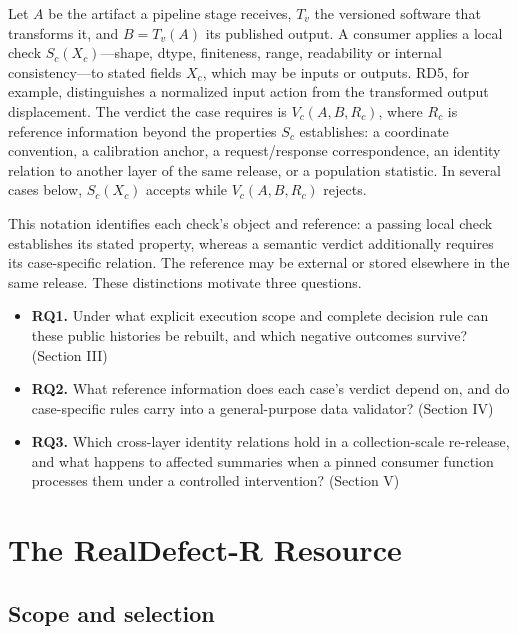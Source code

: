 \documentclass[conference]{IEEEtran}
\begin{document}
Let \(A\) be the artifact a pipeline stage receives, \(T_v\) the versioned software that transforms it, and \(B = T_v(A)\) its published output. A consumer applies a local check \(S_c(X_c)\)---shape, dtype, finiteness, range, readability or internal consistency---to stated fields \(X_c\), which may be inputs or outputs. RD5, for example, distinguishes a normalized input action from the transformed output displacement. The verdict the case requires is \(V_c(A, B, R_c)\), where \(R_c\) is reference information beyond the properties \(S_c\) establishes: a coordinate convention, a calibration anchor, a request/response correspondence, an identity relation to another layer of the same release, or a population statistic. In several cases below, \(S_c(X_c)\) accepts while \(V_c(A, B, R_c)\) rejects.\par

This notation identifies each check's object and reference: a passing local check establishes its stated property, whereas a semantic verdict additionally requires its case-specific relation. The reference may be external or stored elsewhere in the same release. These distinctions motivate three questions.\par

\begin{itemize}

\item \textbf{RQ1.} Under what explicit execution scope and complete decision rule can these public histories be rebuilt, and which negative outcomes survive? (Section III)

\item \textbf{RQ2.} What reference information does each case's verdict depend on, and do case-specific rules carry into a general-purpose data validator? (Section IV)

\item \textbf{RQ3.} Which cross-layer identity relations hold in a collection-scale re-release, and what happens to affected summaries when a pinned consumer function processes them under a controlled intervention? (Section V)

\end{itemize}

\section{The \mbox{RealDefect-R} Resource}

\subsection{Scope and selection}
\end{document}
